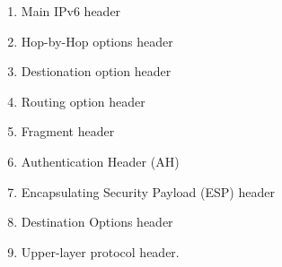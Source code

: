 \documentclass[11pt]{article}
\begin{document}
\begin{enumerate}
\item Main IPv6 header
\item Hop-by-Hop options header
\item Destionation option header
\item Routing option header
\item Fragment header
\item Authentication Header (AH)
\item Encapsulating Security Payload (ESP) header
\item Destination Options header
\item Upper-layer protocol header.
\end{enumerate}
\end{document}
